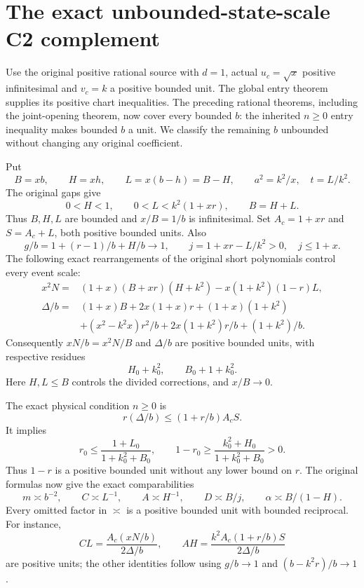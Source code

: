 \section[The exact unbounded-state-scale C2 complement]{The exact unbounded-state-scale C2 complement}
\label{sec:c2-unbounded-b-reduction}

Use the original positive rational source with $d=1$, actual
$u_c=\sqrt x$ positive infinitesimal and $v_c=k$ a positive bounded
unit. The global entry theorem supplies its positive chart inequalities.
The preceding rational theorems, including the joint-opening theorem,
now cover every bounded $b$: the inherited $n\ge0$ entry inequality
makes bounded $b$ a unit. We classify the remaining $b$ unbounded
without changing any original coefficient.

Put
\[
 B=xb,\qquad H=xh,\qquad L=x(b-h)=B-H,\qquad
 a^2=k^2/x,\quad t=L/k^2.
\]
The original gaps give
\[
 0<H<1,\qquad0<L<k^2(1+xr),\qquad B=H+L.
\]
Thus $B,H,L$ are bounded and $x/B=1/b$ is infinitesimal.
Set $A_c=1+xr$ and $S=A_c+L$, both positive bounded units. Also
\[
 g/b=1+(r-1)/b+H/b\longrightarrow1,
 \qquad j=1+xr-L/k^2>0,\quad j\le1+x.
\]
The following exact rearrangements of the original short polynomials
control every event scale:
\begin{align*}
 x^2N={}&(1+x)(B+xr)(H+k^2)-x(1+k^2)(1-r)L,\\
 \Delta/b={}&(1+x)B+2x(1+x)r+(1+x)(1+k^2)\\
 &+(x^2-k^2x)r^2/b+2x(1+k^2)r/b+(1+k^2)/b.
\end{align*}
Consequently $xN/b=x^2N/B$ and $\Delta/b$ are positive bounded
units, with respective residues
\[
 H_0+k_0^2,\qquad B_0+1+k_0^2.
\]
Here $H,L\le B$ controls the divided corrections, and $x/B\to0$.

The exact physical condition $n\ge0$ is
\[
 r(\Delta/b)\le(1+r/b)A_cS.
\]
It implies
\[
 r_0\le\frac{1+L_0}{1+k_0^2+B_0},\qquad
 1-r_0\ge\frac{k_0^2+H_0}{1+k_0^2+B_0}>0.
\]
Thus $1-r$ is a positive bounded unit without any lower bound on $r$.
The original formulas now give the exact comparabilities
\[
 m\asymp b^{-2},\qquad C\asymp L^{-1},\qquad A\asymp H^{-1},
 \qquad D\asymp B/j,\qquad\alpha\asymp B/(1-H).
 \tag{SR1}
\]
Every omitted factor in $\asymp$ is a positive bounded unit with
bounded reciprocal. For instance,
\[
 CL=\frac{A_c(xN/b)}{2\Delta/b},\qquad
 AH=\frac{k^2A_c(1+r/b)S}{2\Delta/b}
\]
are positive units; the other identities follow using $g/b\to1$
and $(b-k^2r)/b\to1$.

